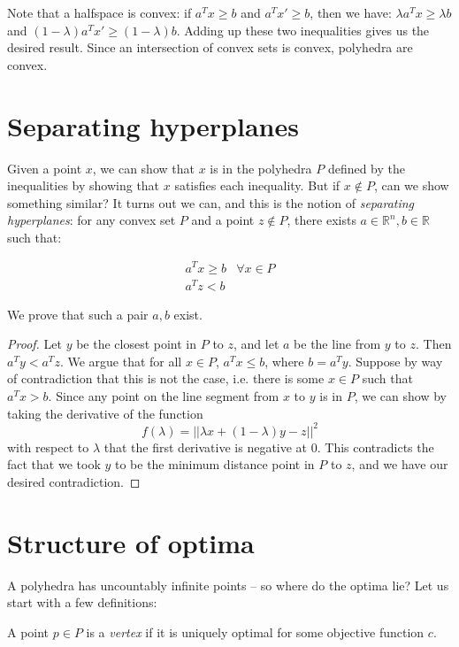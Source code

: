 \documentclass{article}
\newcommand{\reals}{\ensuremath{\mathbb{R}}}
\begin{document}
Note that a halfspace is convex: if $a^T x \geq b$ and $a^T x' \geq
b$, then we have: $\lambda a^T x \geq \lambda b$ and $(1-\lambda)a^T
x' \geq (1-\lambda)b$.  Adding up these two inequalities gives us the
desired result.  Since an intersection of convex sets is convex,
polyhedra are convex.

\section{Separating hyperplanes}

Given a point $x$, we can show that $x$ is in the polyhedra $P$
defined by the inequalities by showing that $x$ satisfies each
inequality.  But if $x \notin P$, can we show something similar?  It
turns out we can, and this is the notion of \emph{separating
  hyperplanes}: for any convex set $P$ and a point $z \notin P$, there
exists $a \in \reals^n, b \in \reals$ such that:

\begin{eqnarray*}
  a^T x \geq b & \forall x \in P\\
  a^T z < b
\end{eqnarray*}

We prove that such a pair $a,b$ exist.

\begin{proof}
  Let $y$ be the closest point in $P$ to $z$, and let $a$ be the line
  from $y$ to $z$.  Then $a^T y < a^T z$.  We argue that for all $x
  \in P$, $a^T x \leq b$, where $b = a^T y$.  Suppose by way of
  contradiction that this is not the case, i.e. there is some $x \in
  P$ such that $a^T x > b$.  Since any point on the line segment from
  $x$ to $y$ is in $P$, we can show by taking the derivative of the
  function
  $$f(\lambda) = ||\lambda x + (1-\lambda) y - z||^2$$
  with respect to
  $\lambda$ that the first derivative is negative at $0$.  This
  contradicts the fact that we took $y$ to be the minimum distance
  point in $P$ to $z$, and we have our desired contradiction.
\end{proof}

\section{Structure of optima}

A polyhedra has uncountably infinite points -- so where do the optima
lie?  Let us start with a few definitions:

\begin{definition}
  A point $p \in P$ is a \emph{vertex} if it is uniquely optimal for
  some objective function $c$.
\end{definition}
\end{document}
